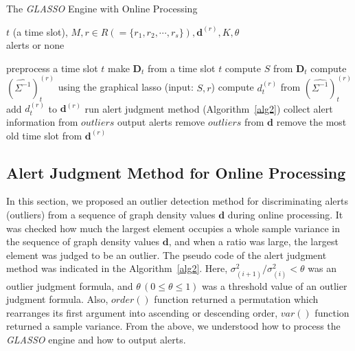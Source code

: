 \documentclass[conference]{IEEEtran}
\begin{document}

\begin{algorithm}[tb]
\caption{The {\it GLASSO} Engine with Online Processing}
\label{alg1}
\begin{algorithmic}[1]
  \REQUIRE $t$ (a time slot), $M, r \in R ( = \{r_1, r_2, \cdots, r_s\} ), \bm{d}^{(r)}, K, \theta$\\
  \ENSURE alerts or none

    \STATE preprocess a time slot $t$
    \STATE make $\bm{D}_t$ from a time slot $t$
    \STATE compute $S$ from $\bm{D}_t$
      \STATE compute ${(\hat{\Sigma^{-1}})}_t^{(r)}$ using the graphical lasso (input: $S,r$)
      \STATE compute $d_t^{(r)}$ from ${(\hat{\Sigma^{-1}})}_t^{(r)}$
      \STATE add $d_t^{(r)}$ to $\bm{d}^{(r)}$
        \STATE run alert judgment method (Algorithm~\ref{alg2})
          \STATE collect alert information from $outliers$
          \STATE output alerts
          \STATE remove $outliers$ from $\bm{d}$
        \ELSE
          \STATE remove the most old time slot from $\bm{d}^{(r)}$
        \ENDIF
  		\ENDIF
  	\ENDFOR
  \ENDFOR
\end{algorithmic}
\end{algorithm}





\subsection{Alert Judgment Method for Online Processing}
In this section, we proposed an outlier detection method for discriminating alerts (outliers) from a sequence of graph density values $\bm{d}$ during online processing.
It was checked how much the largest element occupies a whole sample variance in the sequence of graph density values $\bm{d}$, and when a ratio was large, the largest element was judged to be an outlier.
The pseudo code of the alert judgment method was indicated in the Algorithm~\ref{alg2}.
Here, $\sigma^{2}_{(i+1)}/\sigma^{2}_{(i)}<\theta$ was an outlier judgment formula, and $\theta \, (0\leq \theta \leq 1)$ was a threshold value of an outlier judgment formula.
Also, $order()$ function returned a permutation which rearranges its first argument into ascending or descending order, $var()$ function returned a sample variance.
From the above, we understood how to process the {\it GLASSO} engine and how to output alerts.
\end{document}
